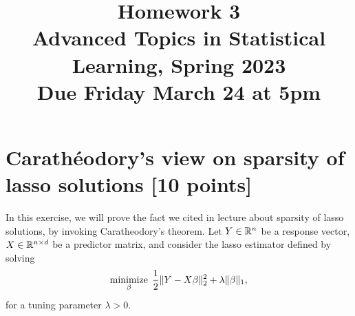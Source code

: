 \documentclass{article}
\title{Homework 3 \\ \smallskip
\large Advanced Topics in Statistical Learning, Spring 2023 \\ \smallskip
Due Friday March 24 at 5pm}
\date{}
\begin{document}
\maketitle
\RaggedRight
\vspace{-50pt}

\section{Carath\'{e}odory's view on sparsity of lasso solutions [10 points]} 

In this exercise, we will prove the fact we cited in lecture about sparsity of
lasso solutions, by invoking Caratheodory's theorem. Let $Y \in \mathbb{R}^n$ be a
response vector, $X \in \mathbb{R}^{n \times d}$ be a predictor matrix, and consider
the lasso estimator defined by solving
\[
\mathop{\mathrm{minimize}}_\beta \; \frac{1}{2} \|Y - X\beta\|_2^2 + \lambda \|\beta\|_1,
\]
for a tuning parameter $\lambda > 0$.
\end{document}
